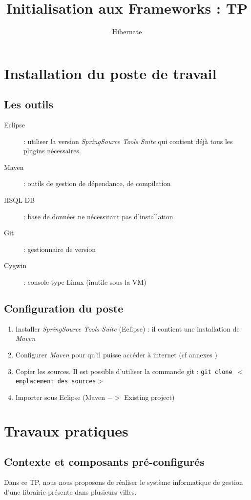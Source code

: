 \documentclass[small,algo]{dushClass}
\title{Initialisation aux Frameworks : TP}
\subtitle{Hibernate}
\begin{document}
\section{Installation du poste de travail}

\subsection{Les outils}
\begin{description}
\item[Eclipse] : utiliser la version \emph{SpringSource Tools Suite} qui contient déjà tous les plugins nécessaires.
\item[Maven] : outils de gestion de dépendance, de compilation
\item[HSQL DB] : base de données ne nécessitant pas d'installation
\item[Git] : gestionnaire de version
\item[Cygwin] : console type Linux (inutile sous la VM)
\end{description}

\subsection{Configuration du poste}
\begin{enumerate}
\item Installer \emph{SpringSource Tools Suite} (Eclipse) : il contient une installation de \emph{Maven}
\item Configurer \emph{Maven} pour qu'il puisse accéder à internet (cf annexes )
\item Copier les sources. Il est possible d'utiliser la commande git : \texttt{git clone $<$emplacement des sources$>$ }
\item Importer sous Eclipse (Maven $->$ Existing project)
\end{enumerate}


\section{Travaux pratiques}

\subsection{Contexte et composants pré-configurés}
Dans ce TP, nous nous proposons de réaliser le système informatique de gestion d'une librairie présente dans plusieurs villes.\\
\end{document}
